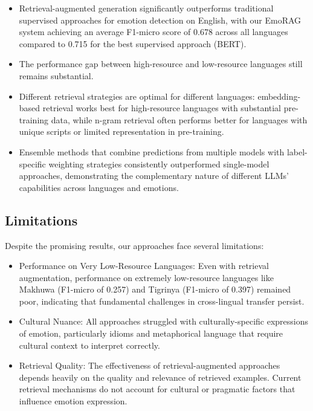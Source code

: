 \documentclass[a4paper,12pt]{extarticle}
\begin{document}
\begin{itemize}
    \item Retrieval-augmented generation significantly outperforms traditional supervised approaches for emotion detection on English, with our EmoRAG system achieving an average F1-micro score of 0.678 across all languages compared to 0.715 for the best supervised approach (BERT).
    
    \item The performance gap between high-resource and low-resource languages still remains substantial.
    
    \item Different retrieval strategies are optimal for different languages: embedding-based retrieval works best for high-resource languages with substantial pre-training data, while n-gram retrieval often performs better for languages with unique scripts or limited representation in pre-training.
    
    \item Ensemble methods that combine predictions from multiple models with label-specific weighting strategies consistently outperformed single-model approaches, demonstrating the complementary nature of different LLMs' capabilities across languages and emotions.
    
\end{itemize}

\subsection{Limitations}

Despite the promising results, our approaches face several limitations:

\begin{itemize}
    \item Performance on Very Low-Resource Languages: Even with retrieval augmentation, performance on extremely low-resource languages like Makhuwa (F1-micro of 0.257) and Tigrinya (F1-micro of 0.397) remained poor, indicating that fundamental challenges in cross-lingual transfer persist.
    
    \item Cultural Nuance: All approaches struggled with culturally-specific expressions of emotion, particularly idioms and metaphorical language that require cultural context to interpret correctly.
    
    \item Retrieval Quality: The effectiveness of retrieval-augmented approaches depends heavily on the quality and relevance of retrieved examples. Current retrieval mechanisms do not account for cultural or pragmatic factors that influence emotion expression.
    
\end{itemize}
\end{document}
